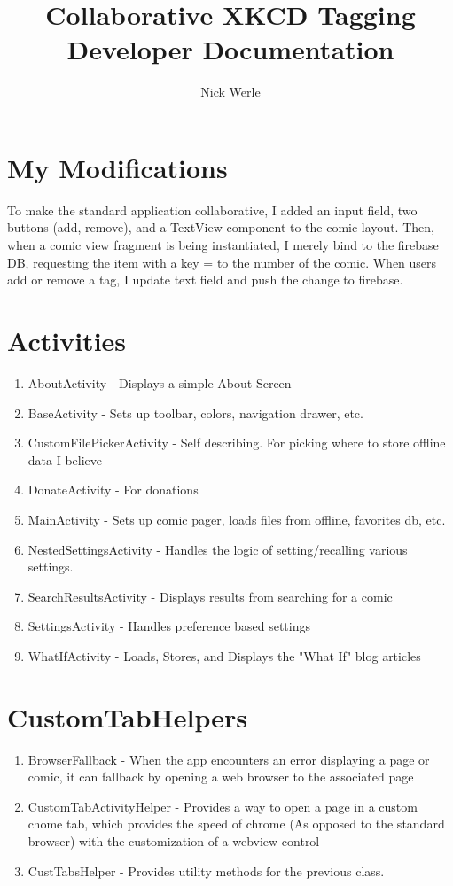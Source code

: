 \documentclass{article}
\title{Collaborative XKCD Tagging Developer Documentation}
\author{Nick Werle}
\begin{document}
\maketitle
\section{My Modifications}
To make the standard application collaborative, I added an input field, two buttons (add, remove), and a TextView component to the comic layout.
Then, when a comic view fragment is being instantiated, I merely bind to the firebase DB, requesting the item with a key = to the number of the comic.
When users add or remove a tag, I update text field and push the change to firebase.

\section{Activities}
\begin{enumerate}
\item AboutActivity - Displays a simple About Screen
\item BaseActivity - Sets up toolbar, colors, navigation drawer, etc.
\item CustomFilePickerActivity - Self describing. For picking where to store offline data I believe
\item DonateActivity - For donations
\item MainActivity - Sets up comic pager, loads files from offline, favorites db, etc.
\item NestedSettingsActivity - Handles the logic of setting/recalling various settings.
\item SearchResultsActivity - Displays results from searching for a comic
\item SettingsActivity - Handles preference based settings 
\item WhatIfActivity - Loads, Stores, and Displays the "What If" blog articles
\end{enumerate}

\section{CustomTabHelpers}
\begin{enumerate}
\item BrowserFallback - When the app encounters an error displaying a page or comic, it can fallback by opening a web browser to the associated page
\item CustomTabActivityHelper - Provides a way to open a page in a custom chome tab, which provides the speed of chrome (As opposed to the standard browser) with the customization of a webview control
\item CustTabsHelper - Provides utility methods for the previous class.
\end{enumerate}
\end{document}
